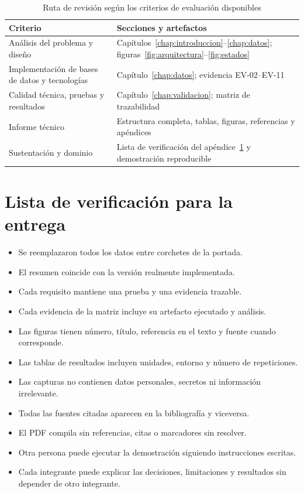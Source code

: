 \begin{table}[H]
  \centering
  \caption{Ruta de revisión según los criterios de evaluación disponibles}
  \label{tab:rubrica}
  \begin{tabularx}{\textwidth}{@{}p{5cm}Y@{}}
    \toprule
    \textbf{Criterio} & \textbf{Secciones y artefactos} \\
    \midrule
    Análisis del problema y diseño & Capítulos~\ref{chap:introduccion}--\ref{chap:datos}; figuras~\ref{fig:arquitectura}--\ref{fig:estados} \\
    Implementación de bases de datos y tecnologías & Capítulo~\ref{chap:datos}; evidencia EV-02--EV-11 \\
    Calidad técnica, pruebas y resultados & Capítulo~\ref{chap:validacion}; matriz de trazabilidad \\
    Informe técnico & Estructura completa, tablas, figuras, referencias y apéndices \\
    Sustentación y dominio & Lista de verificación del apéndice~\ref{app:entrega} y demostración reproducible \\
    \bottomrule
  \end{tabularx}
\end{table}

\chapter{Lista de verificación para la entrega}
\label{app:entrega}

\begin{itemize}[label=$\square$]
  \item Se reemplazaron todos los datos entre corchetes de la portada.
  \item El resumen coincide con la versión realmente implementada.
  \item Cada requisito mantiene una prueba y una evidencia trazable.
  \item Cada evidencia de la matriz incluye su artefacto ejecutado y análisis.
  \item Las figuras tienen número, título, referencia en el texto y fuente cuando corresponde.
  \item Las tablas de resultados incluyen unidades, entorno y número de repeticiones.
  \item Las capturas no contienen datos personales, secretos ni información irrelevante.
  \item Todas las fuentes citadas aparecen en la bibliografía y viceversa.
  \item El PDF compila sin referencias, citas o marcadores sin resolver.
  \item Otra persona puede ejecutar la demostración siguiendo instrucciones escritas.
  \item Cada integrante puede explicar las decisiones, limitaciones y resultados sin depender de otro integrante.
\end{itemize}
